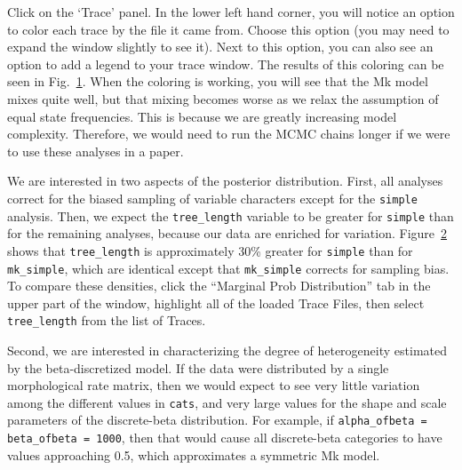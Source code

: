 Click on the `Trace' panel.
In the lower left hand corner, you will notice an option to color each trace by the file it came from.
Choose this option (you may need to expand the window slightly to see it).
Next to this option, you can also see an option to add a legend to your trace window.
The results of this coloring can be seen in Fig.~\ref{fig:coltrace}.
When the coloring is working, you will see that the Mk model mixes quite well, but that mixing becomes worse as we relax the assumption of equal state frequencies.
This is because we are greatly increasing model complexity.
Therefore, we would need to run the MCMC chains longer if we were to use these analyses in a paper. \par

\begin{figure}[h!]
\label{fig:coltrace}
\end{figure}


We are interested in two aspects of the posterior distribution.
First, all analyses correct for the biased sampling of variable characters except for the {\tt simple} analysis.
Then, we expect the {\tt tree\_length} variable to be greater for {\tt simple} than for the remaining analyses, because our data are enriched for variation.
Figure~\ref{fig:tracer_tree_length} shows that {\tt tree\_length} is approximately 30\% greater for {\tt simple} than for {\tt mk\_simple}, which are identical except that {\tt mk\_simple} corrects for sampling bias.
To compare these densities, click the ``Marginal Prob Distribution'' tab in the upper part of the window, highlight all of the loaded Trace Files, then select {\tt tree\_length} from the list of Traces.

\begin{figure}[h!]
\label{fig:tracer_tree_length}
\end{figure}

Second, we are interested in characterizing the degree of heterogeneity estimated by the beta-discretized model.
If the data were distributed by a single morphological rate matrix, then we would expect to see very little variation among the different values in {\tt cats}, and very large values for the shape and scale parameters of the discrete-beta distribution.
For example, if {\tt alpha\_ofbeta = beta\_ofbeta = 1000}, then that would cause all discrete-beta categories to have values approaching 0.5, which approximates a symmetric Mk model.

